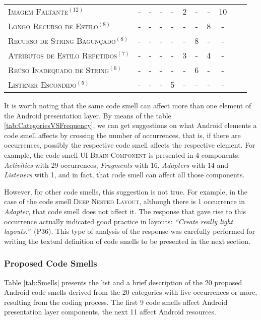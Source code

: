\begin{table*}[!htb]
\begin{tabular}{@{}p{7cm}@{}cccccccccp{3cm}}
\textsc{Imagem Faltante}$^{(12)}$                & -   & -   & -   & -   & 2    & -   & -   & 10 &  \\
\textsc{Longo Recurso de Estilo}$^{(8)}$         & -   & -   & -   & -   & -    & -   & 8   & -  &  \\
\textsc{Recurso de String Bagunçado}$^{(8)}$     & -   & -   & -   & -   & -    & 8   & -   & -  &  \\
\textsc{Atributos de Estilo Repetidos}$^{(7)}$   & -   & -   & -   & -   & 3    & -   & 4   & -  &  \\
\textsc{Reúso Inadequado de String}$^{(6)}$      & -   & -   & -   & -   & -    & 6   & -   & -  &  \\
\textsc{Listener Escondido}$^{(5)}$              & -   & -   & -   & 5   & -    & -   & -   & -  &  \\
\bottomrule
\end{tabular}
\label{tab:CategoriesVSFrequency}
\end{table*}

It is worth noting that the same code smell can affect more than one element of the Android presentation layer. By means of the table \ref{tab:CategoriesVSFrequency}, we can get suggestions on what Android elements a code smell affects by crossing the number of occurrences, that is, if there are occurrences, possibly the respective code smell affects the respective element. For example, the code smell \textsc{\small UI Brain Component} is presented in 4 components: \textit{Activities} with 29 occurrences, \textit{Fragments} with 16, \textit{Adapters} with 14 and \textit{Listeners} with 1, and in fact, that code smell can affect all those components.

However, for other code smells, this suggestion is not true. For example, in the case of the code smell \textsc{\small Deep Nested Layout}, although there is 1 occurrence in \textit{Adapter}, that code smell does not affect it. The response that gave rise to this occurrence actually indicated good practice in layouts: \textit{``Create really light layouts.''}~(P36). This type of analysis of the response was carefully performed for writing the textual definition of code smells to be presented in the next section.


\subsubsection{Proposed Code Smells}
\label{phase1-code-smells-derivation}

Table \ref{tab:Smells} presents the list and a brief description of the 20 proposed Android code smells derived from the 20 categories with five occurrences or more, resulting from the coding process. The first 9 code smells affect Android presentation layer components, the next 11 affect Android resources.

